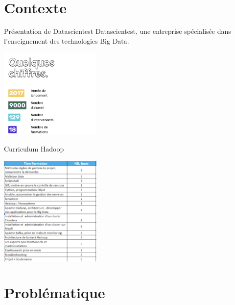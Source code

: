 \documentclass[tiny]{beamer}
\begin{document}
\section{Contexte}
\label{sec:orgc08833c}

\begin{frame}[label={sec:orgd940601}]{Présentation de Datascientest}
Datascientest, une entreprise spécialisée dans l'enseignement des technologies
Big Data.

\begin{center}
\includegraphics[width=5cm]{../../media/dst.png}
\end{center}
\end{frame}


\begin{frame}[label={sec:org4f4ebf1}]{Curriculum Hadoop}
\begin{center}
\includegraphics[width=5cm]{../../media/curriculum.png}
\end{center}
\end{frame}

\section{Problématique}
\label{sec:org6eda196}
\end{document}
